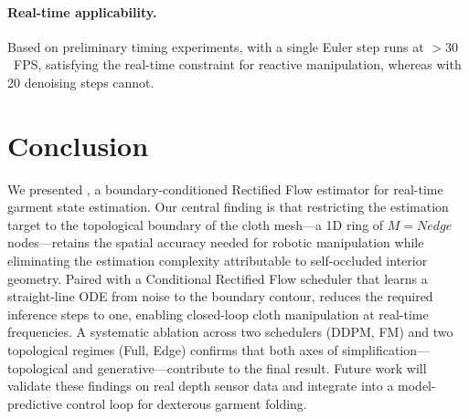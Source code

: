 \documentclass{article}
\begin{document}
\paragraph{Real-time applicability.}
Based on preliminary timing experiments, \edgefm{} with a single Euler step runs at $> 30$~FPS, satisfying the real-time constraint for reactive manipulation, whereas \fullddpm{} with 20 denoising steps cannot.


\section{Conclusion}
\label{sec:conclusion}

We presented \ours{}, a boundary-conditioned Rectified Flow estimator for real-time garment state estimation.
Our central finding is that restricting the estimation target to the topological boundary of the cloth mesh---a 1D ring of $M = Nedge$ nodes---retains the spatial accuracy needed for robotic manipulation while eliminating the estimation complexity attributable to self-occluded interior geometry.
Paired with a Conditional Rectified Flow scheduler that learns a straight-line ODE from noise to the boundary contour, \ours{} reduces the required inference steps to one, enabling closed-loop cloth manipulation at real-time frequencies.
A systematic ablation across two schedulers (DDPM, FM) and two topological regimes (Full, Edge) confirms that both axes of simplification---topological and generative---contribute to the final result.
Future work will validate these findings on real depth sensor data and integrate \ours{} into a model-predictive control loop for dexterous garment folding.


\clearpage


\end{document}
